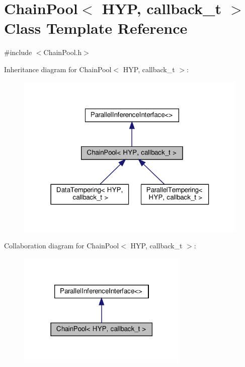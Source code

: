 \hypertarget{class_chain_pool}{}\section{Chain\+Pool$<$ H\+YP, callback\+\_\+t $>$ Class Template Reference}
\label{class_chain_pool}


{\ttfamily \#include $<$Chain\+Pool.\+h$>$}



Inheritance diagram for Chain\+Pool$<$ H\+YP, callback\+\_\+t $>$\+:
\nopagebreak
\begin{figure}[H]
\begin{center}
\leavevmode
\includegraphics[width=316pt]{class_chain_pool__inherit__graph}
\end{center}
\end{figure}


Collaboration diagram for Chain\+Pool$<$ H\+YP, callback\+\_\+t $>$\+:\nopagebreak
\begin{figure}[H]
\begin{center}
\leavevmode
\includegraphics[width=231pt]{class_chain_pool__coll__graph}
\end{center}
\end{figure}
